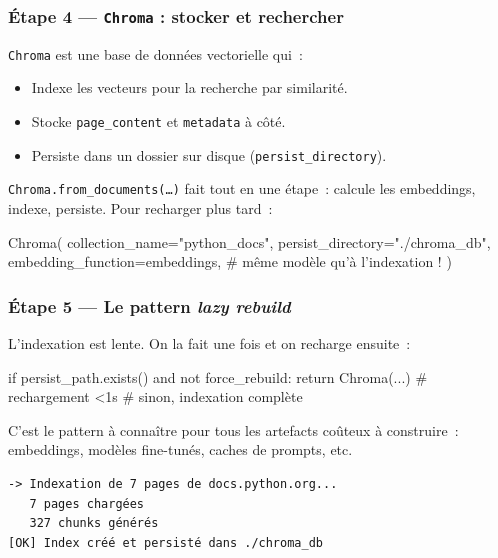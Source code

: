 \documentclass[11pt,a4paper]{article}
\begin{document}
\subsubsection*{Étape 4 — \texttt{Chroma} : stocker et rechercher}

\texttt{Chroma} est une base de données vectorielle qui~:
\begin{itemize}[leftmargin=*]
  \item Indexe les vecteurs pour la recherche par similarité.
  \item Stocke \texttt{page\_content} et \texttt{metadata} à côté.
  \item Persiste dans un dossier sur disque
        (\texttt{persist\_directory}).
\end{itemize}

\texttt{Chroma.from\_documents(\dots)} fait tout en une étape~: calcule
les embeddings, indexe, persiste. Pour recharger plus tard~:

\begin{pythoncode}
Chroma(
    collection_name="python_docs",
    persist_directory="./chroma_db",
    embedding_function=embeddings,  # même modèle qu'à l'indexation !
)
\end{pythoncode}

\subsubsection*{Étape 5 — Le pattern \emph{lazy rebuild}}

L'indexation est lente. On la fait une fois et on recharge ensuite~:

\begin{pythoncode}
if persist_path.exists() and not force_rebuild:
    return Chroma(...)             # rechargement <1s
# sinon, indexation complète
\end{pythoncode}

C'est le pattern à connaître pour tous les artefacts coûteux à construire~:
embeddings, modèles fine-tunés, caches de prompts, etc.

\begin{tcolorbox}[
  colback=white,
  colframe=black!50,
  coltitle=black,
  fonttitle=\footnotesize\bfseries,
  fontupper=\footnotesize,
  title=Sortie de l'exécution,
  breakable,
]
\begin{verbatim}
-> Indexation de 7 pages de docs.python.org...
   7 pages chargées
   327 chunks générés
[OK] Index créé et persisté dans ./chroma_db
\end{verbatim}
\end{tcolorbox}
\end{document}
